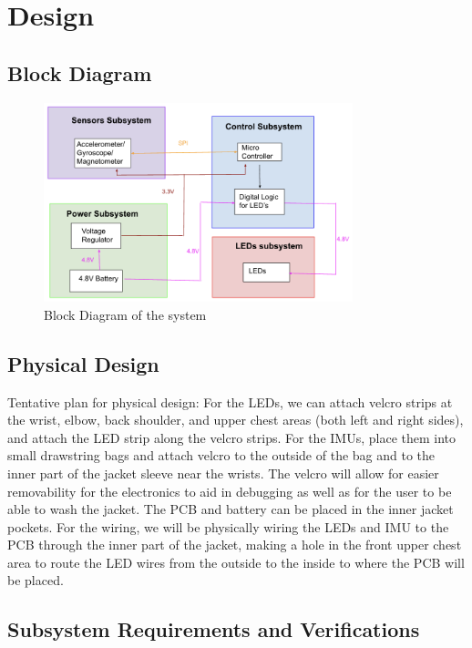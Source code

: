 \documentclass[12pt]{article}
\begin{document}
\newpage
\section{Design}
\subsection{Block Diagram}
\begin{figure}[ht]
    \centering
    \includegraphics[width=0.8\textwidth]{block_diagram.png}
    \caption{Block Diagram of the system}
    \label{fig:my_label1}
\end{figure}

\subsection{Physical Design}
Tentative plan for physical design: For the LEDs, we can attach velcro strips at the wrist, elbow, back shoulder, and upper chest areas (both left and right sides), and attach the LED strip along the velcro strips. For the IMUs, place them into small drawstring bags and attach velcro to the outside of the bag and to the inner part of the jacket sleeve near the wrists. The velcro will allow for easier removability for the electronics to aid in debugging as well as for the user to be able to wash the jacket. The PCB and battery can be placed in the inner jacket pockets. For the wiring, we will be physically wiring the LEDs and IMU to the PCB through the inner part of the jacket, making a hole in the front upper chest area to route the LED wires from the outside to the inside to where the PCB will be placed. 
\subsection{Subsystem Requirements and Verifications}
\end{document}
